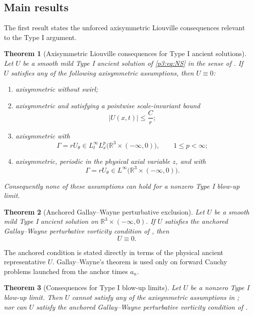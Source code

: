\documentclass[11pt]{amsart}
\theoremstyle{plain}
\newtheorem{theorem}{Theorem}[section]
\theoremstyle{definition}
\theoremstyle{remark}
\numberwithin{equation}{section}
\begin{document}
\subsection{Main results}

The first result states the unforced axisymmetric Liouville consequences
relevant to the Type I argument.

\begin{theorem}[Axisymmetric Liouville consequences for Type I ancient solutions]
\label{p3:thm:axisymmetric-liouville}
Let \(U\) be a smooth mild Type I ancient solution of \eqref{p3:eq:NS}
in the sense of .  If \(U\) satisfies any of the following axisymmetric
assumptions, then \(U\equiv0\):
\begin{enumerate}[label=\textup{(\roman*)}]
\item axisymmetric without swirl;
\item axisymmetric and satisfying a pointwise scale-invariant bound
\[
   |U(x,t)|\le \frac{C}{r};
\]
\item axisymmetric with
\[
   \Gamma=rU_\theta\in L_t^\infty L_x^p
   \bigl(\mathbb R^3\times(-\infty,0)\bigr),
   \qquad 1\le p<\infty;
\]
\item axisymmetric, periodic in the physical axial variable \(z\), and with
\[
   \Gamma=rU_\theta\in L^\infty
   \bigl(\mathbb R^3\times(-\infty,0)\bigr).
\]
\end{enumerate}
Consequently none of these assumptions can hold for a nonzero Type I blow-up
limit.
\end{theorem}

\begin{theorem}[Anchored Gallay--Wayne perturbative exclusion]
\label{p3:thm:weighted-vorticity-vanishing-intro}
Let \(U\) be a smooth mild Type I ancient solution on
\(\mathbb R^3\times(-\infty,0)\).  If \(U\) satisfies the anchored
Gallay--Wayne perturbative vorticity condition of
, then
\[
   U\equiv0.
\]
\end{theorem}

The anchored condition is stated directly in terms of the physical ancient
representative \(U\).  Gallay--Wayne's theorem is used only on forward Cauchy
problems launched from the anchor times \(a_n\).

\begin{theorem}[Consequences for Type I blow-up limits]
\label{p3:thm:typeI-consequences}
Let \(U\) be a nonzero Type I blow-up limit.  Then \(U\) cannot satisfy any of
the axisymmetric assumptions in ; nor can
\(U\) satisfy the anchored Gallay--Wayne perturbative vorticity condition of
.
\end{theorem}
\end{document}
